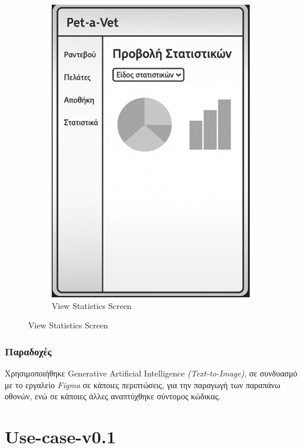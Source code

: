 \documentclass[12pt,a4paper,twoside]{book}
\begin{document}
\begin{figure}[H]
\begin{subfigure}[b]{0.48\textwidth}
        \includegraphics[width=\textwidth]{Mockup Screens/View_statistics.png}
        \caption{View Statistics Screen}\label{fig:mockup12}
    \end{subfigure}
\end{figure}

\subsection{Παραδοχές} %

Χρησιμοποιήθηκε Generative Artificial Intelligence \textit{(Text-to-Image)}, σε συνδυασμό με το εργαλείο \textit{Figma} σε κάποιες περιπτώσεις, για την παραγωγή των παραπάνω οθονών, ενώ σε κάποιες άλλες αναπτύχθηκε σύντομος κώδικας. %

\chapter{Use-case-v0.1}
\end{document}
